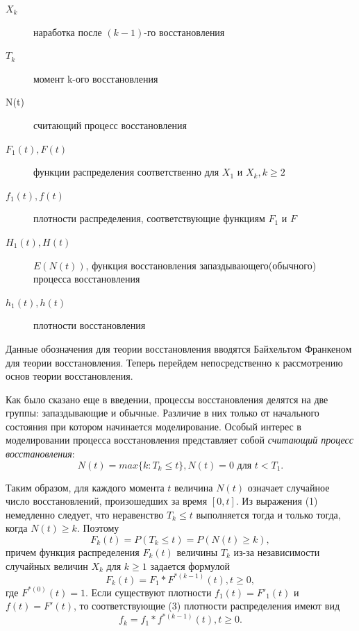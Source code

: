 \begin{description}
\item[$X_k$] наработка после $(k-1)$-го восстановления
\item[$T_k$] момент k-ого восстановления
\item[N(t)] считающий процесс восстановления
\item[$F_1(t), F(t)$] функции распределения соответственно для $X_1$ и $X_k, k \geqslant 2$
\item[$f_1(t), f(t)$] плотности распределения, соответствующие функциям $F_1$ и $F$
\item[$H_1(t), H(t)$] $E(N(t))$, функция восстановления запаздывающего(обычного) процесса восстановления
\item[$h_1(t), h(t)$] плотности восстановления
\end{description}

Данные обозначения для теории восстановления вводятся Байхельтом Франкеном для теории восстановления. Теперь перейдем непосредственно  к рассмотрению основ теории восстановления.

Как было сказано еще в введении, процессы восстановления делятся на две группы: запаздывающие и обычные. Различие в них только от начального состояния при котором начинается моделирование. Особый интерес в моделировании процесса восстановления представляет собой \textit{считающий процесс восстановления}:
\begin{equation}
N(t) = max\{k: T_k \leqslant t\}, N(t) = 0 \text{ для } t < T_1.
\end{equation}

Таким образом, для каждого момента $t$ величина $N(t)$ означает случайное число восстановлений, произошедших за время $[0, t]$. Из выражения (1) немедленно следует, что неравенство $T_k \leqslant t$ выполняется тогда и только тогда, когда $N(t) \geqslant k$.  Поэтому
\begin{equation}
F_k(t) = P(T_k \leqslant t) = P(N(t) \geqslant k),
\end{equation}
причем функция распределения $F_k(t)$ величины $T_k$ из-за независимости случайных величин $X_k$ для $k \geqslant 1$ задается формулой
\begin{equation}
F_k(t) = F_1 * F^{*(k-1)}(t), t \geqslant 0,
\end{equation}
где $F^{*(0)}(t) = 1$. Если существуют плотности $f_1(t) = F'_1(t)$ и $f(t) = F'(t)$, то соответствующие (3) плотности распределения имеют вид
\begin{equation}
f_k = f_1 * f^{*(k-1)}(t), t \geqslant 0.
\end{equation}


